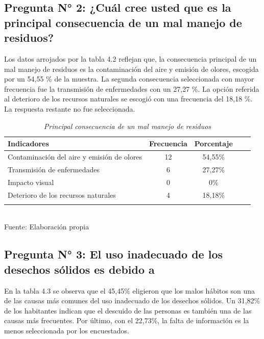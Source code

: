 {\setlength{\parskip}{0cm}
\subsection{Pregunta N° 2: ¿Cuál cree usted que es la principal consecuencia de un mal manejo de residuos?}

Los datos arrojados por la tabla 4.2 reflejan que, la consecuencia principal de un mal manejo de residuos es la contaminación del aire y emisión de olores, escogida por un 54,55 \% de la muestra. La segunda consecuencia seleccionada con mayor frecuencia fue la transmisión de enfermedades con un 27,27 \%. La opción referida al deterioro de los recursos naturales se escogió con una frecuencia del 18,18 \%. La respuesta restante no fue seleccionada.
}

\begin{table}[h!]
    \centering
    \captionsetup{singlelinecheck=false, justification=raggedright, labelsep=newline}
    \caption{\textit{Principal consecuencia de un mal manejo de residuos}}
    \begin{tabular}{lcccc}
        \toprule
        Indicadores & Frecuencia & Porcentaje\\
        \midrule
        Contaminación del aire y emisión de olores & 12 & 54,55\% \\
        Transmisión de enfermedades & 6 & 27,27\%\\
        Impacto visual & 0 & 0\% \\
        Deterioro de los recursos naturales & 4 & 18,18\% \\ 
        \bottomrule \\
    \end{tabular}
    \\ \RaggedRight Fuente: Elaboración propia
    \label{table:cuadro2}
\end{table}

{\setlength{\parskip}{0cm}
\subsection{Pregunta N° 3: El uso inadecuado de los desechos sólidos es debido a}

En la tabla 4.3 se observa que el 45,45\% eligieron que los malos hábitos son una de las causas más comunes del uso inadecuado de los desechos sólidos. Un 31,82\% de los habitantes indican que el descuido de las personas es también una de las causas más frecuentes.  Por último, con el 22,73\%, la falta de información es la menos seleccionada por los encuestados.
}

